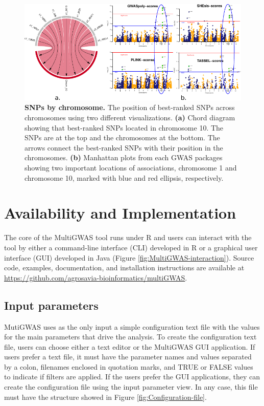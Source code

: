 \documentclass{article}
\begin{document}
\begin{figure}
\begin{centering}
\includegraphics{images/paper-chord-manhattans}
\par\end{centering}
\caption{\textbf{SNPs by chromosome.} The position of best-ranked SNPs across chromosomes using two different visualizations. \textbf{(a)} Chord diagram showing that best-ranked SNPs located in chromosome 10. The SNPs are at the top and the chromosomes at the bottom. The arrows connect the best-ranked SNPs with their position in the chromosomes. \textbf{(b)} Manhattan plots from each GWAS packages showing two important locations of associations, chromosome 1 and chromosome 10, marked with blue and red ellipsis, respectively. \label{fig:Chord-diagrams}}
\end{figure}

\section{Availability and Implementation}

The core of the MultiGWAS tool runs under R and users can interact with the tool by either a command-line interface (CLI) developed in
R or a graphical user interface (GUI) developed in Java (Figure \ref{fig:MultiGWAS-interaction}).
Source code, examples, documentation, and installation instructions are available at \url{https://github.com/agrosavia-bioinformatics/multiGWAS}. 

\subsection{Input parameters}

MutiGWAS uses as the only input a simple configuration text file with the values for the main parameters that drive the analysis. To create the configuration text file, users can choose either a text editor or the MultiGWAS GUI application.  If users prefer a text file, it must have the parameter names and values separated by a colon, filenames enclosed in quotation marks, and TRUE or FALSE values to indicate if filters are applied. If the users prefer the GUI applications, they can create the configuration file using the input parameter view. In any case, this file must have the structure showed in Figure \ref{fig:Configuration-file}.
\end{document}
